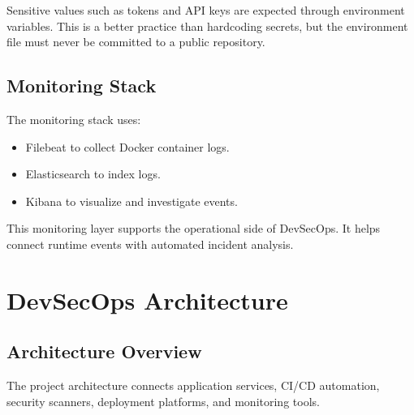 \documentclass[12pt,a4paper]{report}
\begin{document}
Sensitive values such as tokens and API keys are expected through environment variables. This is a better practice than hardcoding secrets, but the environment file must never be committed to a public repository.

\section{Monitoring Stack}

The monitoring stack uses:

\begin{itemize}[leftmargin=*]
    \item Filebeat to collect Docker container logs.
    \item Elasticsearch to index logs.
    \item Kibana to visualize and investigate events.
\end{itemize}

This monitoring layer supports the operational side of DevSecOps. It helps connect runtime events with automated incident analysis.

\chapter{DevSecOps Architecture}

\section{Architecture Overview}

The project architecture connects application services, CI/CD automation, security scanners, deployment platforms, and monitoring tools.
\end{document}
